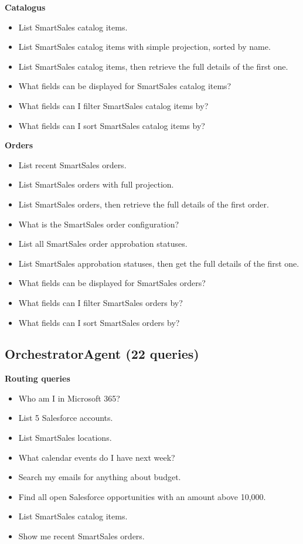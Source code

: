 \begin{appendices}
\textbf{Catalogus}
\begin{itemize}[noitemsep]
  \item List SmartSales catalog items.
  \item List SmartSales catalog items with simple projection, sorted by name.
  \item List SmartSales catalog items, then retrieve the full details of the first one.
  \item What fields can be displayed for SmartSales catalog items?
  \item What fields can I filter SmartSales catalog items by?
  \item What fields can I sort SmartSales catalog items by?
\end{itemize}

\textbf{Orders}
\begin{itemize}[noitemsep]
  \item List recent SmartSales orders.
  \item List SmartSales orders with full projection.
  \item List SmartSales orders, then retrieve the full details of the first order.
  \item What is the SmartSales order configuration?
  \item List all SmartSales order approbation statuses.
  \item List SmartSales approbation statuses, then get the full details of the first one.
  \item What fields can be displayed for SmartSales orders?
  \item What fields can I filter SmartSales orders by?
  \item What fields can I sort SmartSales orders by?
\end{itemize}

\subsection*{OrchestratorAgent (22 queries)}

\textbf{Routing queries}
\begin{itemize}[noitemsep]
  \item Who am I in Microsoft 365?
  \item List 5 Salesforce accounts.
  \item List SmartSales locations.
  \item What calendar events do I have next week?
  \item Search my emails for anything about budget.
  \item Find all open Salesforce opportunities with an amount above 10,000.
  \item List SmartSales catalog items.
  \item Show me recent SmartSales orders.
\end{itemize}


\end{appendices}
